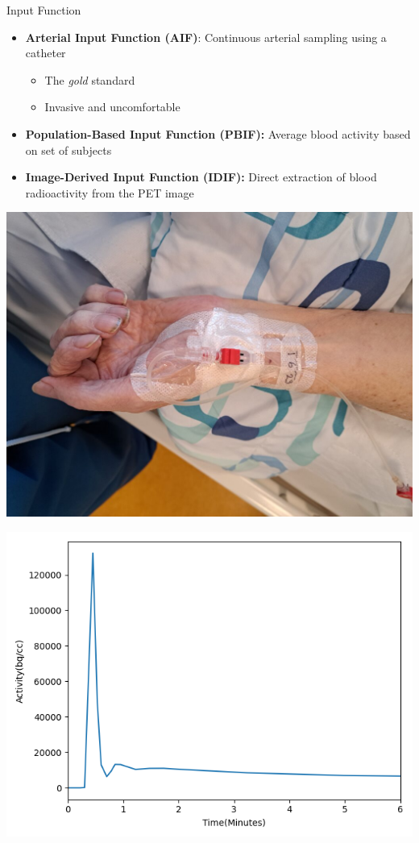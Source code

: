 \documentclass[aspectratio=169]{beamer}
\begin{document}
\begin{frame}{Input Function}
	\centering
	\begin{itemize}
		\item \textbf{Arterial Input Function (AIF)}: Continuous arterial sampling using a catheter
		      \begin{itemize}
			      \item The \textit{gold} standard
			      \item Invasive and uncomfortable
		      \end{itemize}
		\item \textbf{Population-Based Input Function (PBIF):} Average blood activity based on set of subjects
		\item \textbf{Image-Derived Input Function (IDIF):}
		      Direct extraction of blood radioactivity from the PET image
	\end{itemize}

	\begin{center}
		\begin{minipage}{0.40\textwidth}
			\includegraphics[width=\linewidth]{catheter2.jpg}
		\end{minipage}
		\begin{minipage}{0.40\textwidth}
			\includegraphics[width=\linewidth]{aif.png}
		\end{minipage}
		\vfill
	\end{center}


\end{frame}
\end{document}

